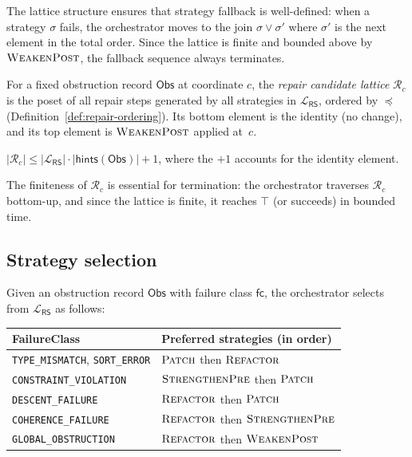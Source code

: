 \documentclass[11pt]{article}
\newcommand{\RS}{\mathsf{RS}}               %
\newcommand{\Patch}{\textsc{Patch}}
\newcommand{\Refactor}{\textsc{Refactor}}
\newcommand{\StrengthenPre}{\textsc{StrengthenPre}}
\newcommand{\WeakenPost}{\textsc{WeakenPost}}
\begin{document}
The lattice structure ensures that strategy fallback is well-defined: when a
strategy $\sigma$ fails, the orchestrator moves to the join
$\sigma \vee \sigma'$ where $\sigma'$ is the next element in the total order.
Since the lattice is finite and bounded above by $\WeakenPost$, the fallback
sequence always terminates.

\begin{definition}
\label{def:candidate-lattice}
For a fixed obstruction record $\mathsf{Obs}$ at coordinate $c$, the
\emph{repair candidate lattice} $\mathcal{R}_c$ is the poset of all
repair steps generated by all strategies in $\mathcal{L}_\RS$, ordered by
$\preceq$ (Definition~\ref{def:repair-ordering}).  Its bottom element is
the identity (no change), and its top element is $\WeakenPost$ applied at~$c$.
\end{definition}

\begin{proposition}
\label{prop:finite-candidates}
$|\mathcal{R}_c| \leq |\mathcal{L}_\RS| \cdot |\mathsf{hints}(\mathsf{Obs})|
+ 1$, where the $+1$ accounts for the identity element.
\end{proposition}

The finiteness of $\mathcal{R}_c$ is essential for termination: the
orchestrator traverses $\mathcal{R}_c$ bottom-up, and since the lattice is
finite, it reaches $\top$ (or succeeds) in bounded time.

\subsection{Strategy selection}

Given an obstruction record $\mathsf{Obs}$ with failure class $\mathsf{fc}$,
the orchestrator selects from $\mathcal{L}_\RS$ as follows:

\begin{center}
\begin{tabular}{ll}
\toprule
\textbf{FailureClass} & \textbf{Preferred strategies (in order)} \\
\midrule
\texttt{TYPE\_MISMATCH}, \texttt{SORT\_ERROR}   & $\Patch$ then $\Refactor$ \\
\texttt{CONSTRAINT\_VIOLATION}                  & $\StrengthenPre$ then $\Patch$ \\
\texttt{DESCENT\_FAILURE}                       & $\Refactor$ then $\Patch$ \\
\texttt{COHERENCE\_FAILURE}                     & $\Refactor$ then $\StrengthenPre$ \\
\texttt{GLOBAL\_OBSTRUCTION}                    & $\Refactor$ then $\WeakenPost$ \\
\bottomrule
\end{tabular}
\end{center}
\end{document}
